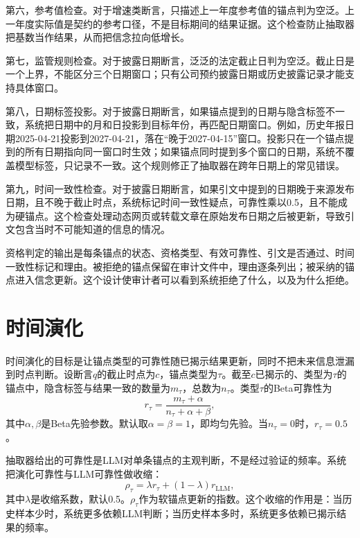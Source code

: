 第六，参考值检查。对于增速类断言，只描述上一年度参考值的锚点判为空泛。上一年度实际值是契约的参考口径，不是目标期间的结果证据。这个检查防止抽取器把基数当作结果，从而把信念拉向低增长。

第七，监管规则检查。对于披露日期断言，泛泛的法定截止日判为空泛。截止日是一个上界，不能区分三个日期窗口；只有公司预约披露日期或历史披露记录才能支持具体窗口。

第八，日期标签投影。对于披露日期断言，如果锚点提到的日期与隐含标签不一致，系统把日期中的月和日投影到目标年份，再匹配日期窗口。例如，历史年报日期2025-04-21投影到2027-04-21，落在“晚于2027-04-15”窗口。投影只在一个锚点提到的所有日期指向同一窗口时生效；如果锚点同时提到多个窗口的日期，系统不覆盖模型标签，只记录不一致。这个规则修正了抽取器在跨年日期上的常见错误。

第九，时间一致性检查。对于披露日期断言，如果引文中提到的日期晚于来源发布日期，且不晚于截止时点，系统标记时间一致性疑点，可靠性乘以0.5，且不能成为硬锚点。这个检查处理动态网页或转载文章在原始发布日期之后被更新，导致引文包含当时不可能知道的信息的情况。

资格判定的输出是每条锚点的状态、资格类型、有效可靠性、引文是否通过、时间一致性标记和理由。被拒绝的锚点保留在审计文件中，理由逐条列出；被采纳的锚点进入信念更新。这个设计使审计者可以看到系统拒绝了什么，以及为什么拒绝。

\section{时间演化}

时间演化的目标是让锚点类型的可靠性随已揭示结果更新，同时不把未来信息泄漏到时点判断。设断言$q$的截止时点为$c$，锚点类型为$\tau$。截至$c$已揭示的、类型为$\tau$的锚点中，隐含标签与结果一致的数量为$m_\tau$，总数为$n_\tau$。类型$\tau$的Beta可靠性为
\begin{equation}
r_\tau=\frac{m_\tau+\alpha}{n_\tau+\alpha+\beta},
\label{eq:beta}
\end{equation}
其中$\alpha,\beta$是Beta先验参数。默认取$\alpha=\beta=1$，即均匀先验。当$n_\tau=0$时，$r_\tau=0.5$。

抽取器给出的可靠性是LLM对单条锚点的主观判断，不是经过验证的频率。系统把演化可靠性与LLM可靠性做收缩：
\begin{equation}
\rho_\tau=\lambda r_\tau+(1-\lambda)r_{\mathrm{LLM}},
\label{eq:shrink}
\end{equation}
其中$\lambda$是收缩系数，默认0.5。$\rho_\tau$作为软锚点更新的指数。这个收缩的作用是：当历史样本少时，系统更多依赖LLM判断；当历史样本多时，系统更多依赖已揭示结果的频率。

